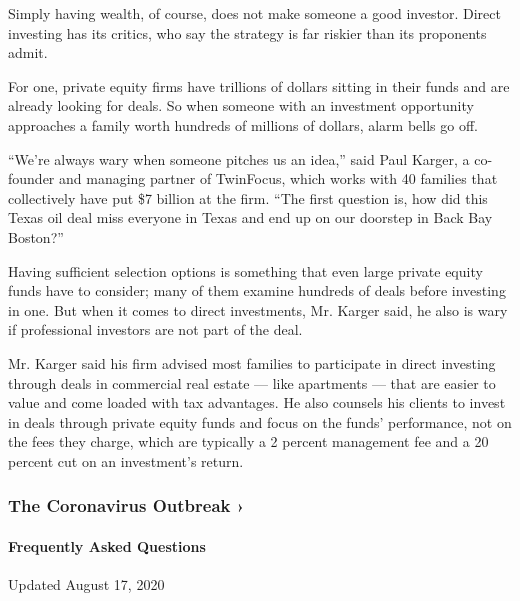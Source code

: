Simply having wealth, of course, does not make someone a good investor.
Direct investing has its critics, who say the strategy is far riskier
than its proponents admit.

For one, private equity firms have trillions of dollars sitting in their
funds and are already looking for deals. So when someone with an
investment opportunity approaches a family worth hundreds of millions of
dollars, alarm bells go off.

``We're always wary when someone pitches us an idea,'' said Paul Karger,
a co-founder and managing partner of TwinFocus, which works with 40
families that collectively have put \$7 billion at the firm. ``The first
question is, how did this Texas oil deal miss everyone in Texas and end
up on our doorstep in Back Bay Boston?''

Having sufficient selection options is something that even large private
equity funds have to consider; many of them examine hundreds of deals
before investing in one. But when it comes to direct investments, Mr.
Karger said, he also is wary if professional investors are not part of
the deal.

Mr. Karger said his firm advised most families to participate in direct
investing through deals in commercial real estate --- like apartments
--- that are easier to value and come loaded with tax advantages. He
also counsels his clients to invest in deals through private equity
funds and focus on the funds' performance, not on the fees they charge,
which are typically a 2 percent management fee and a 20 percent cut on
an investment's return.

\href{https://www.nytimes3xbfgragh.onion/news-event/coronavirus?action=click\&pgtype=Article\&state=default\&region=MAIN_CONTENT_3\&context=storylines_faq}{}

\hypertarget{the-coronavirus-outbreak-}{%
\subsubsection{The Coronavirus Outbreak
›}\label{the-coronavirus-outbreak-}}

\hypertarget{frequently-asked-questions}{%
\paragraph{Frequently Asked
Questions}\label{frequently-asked-questions}}

Updated August 17, 2020

